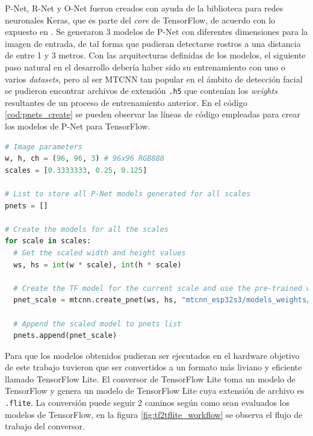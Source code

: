P-Net, R-Net y O-Net fueron creados con ayuda de la biblioteca para redes neuronales Keras, que es parte del \textit{core} de TensorFlow, de acuerdo con lo expuesto en \cite{mtcnn_info}. Se generaron 3 modelos de P-Net con diferentes dimensiones para la imagen de entrada, de tal forma que pudieran detectarse rostros a una distancia de entre 1 y 3 metros. Con las arquitecturas definidas de los modelos, el siguiente paso natural en el desarrollo debería haber sido su entrenamiento con uno o varios \textit{datasets}, pero al ser MTCNN tan popular en el ámbito de detección facial se pudieron encontrar archivos de extensión \texttt{.h5} que contenían los \textit{weights} resultantes de un proceso de entrenamiento anterior. En el código \ref{cod:pnets_create} se pueden observar las líneas de código empleadas para crear los modelos de P-Net para TensorFlow.

\begin{lstlisting}[language=Python, label=cod:pnets_create, caption=Código para crear los modelos de P-Net con TensorFlow.]
# Image parameters
w, h, ch = (96, 96, 3) # 96x96 RGB888
scales = [0.3333333, 0.25, 0.125]

# List to store all P-Net models generated for all scales
pnets = []

# Create the models for all the scales
for scale in scales:
  # Get the scaled width and height values
  ws, hs = int(w * scale), int(h * scale)

  # Create the TF model for the current scale and use the pre-trained weigths
  pnet_scale = mtcnn.create_pnet(ws, hs, "mtcnn_esp32s3/models_weights/12net.h5")

  # Append the scaled model to pnets list
  pnets.append(pnet_scale)
\end{lstlisting}

Para que los modelos obtenidos pudieran ser ejecutados en el hardware objetivo de este trabajo tuvieron que ser convertidos a un formato más liviano y eficiente llamado TensorFlow Lite. El conversor de TensorFlow Lite toma un modelo de TensorFlow y genera un modelo de TensorFlow Lite cuya extensión de archivo es \texttt{.flite}. La conversión puede seguir 2 caminos según como sean evaluados los modelos de TensorFlow, en la figura \ref{fig:tf2tflite_workflow} se observa el flujo de trabajo del conversor.


